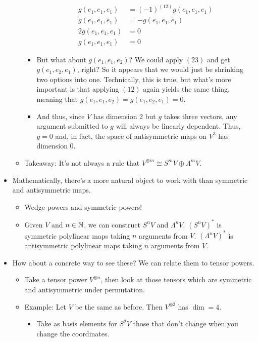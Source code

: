 \documentclass[../notes.tex]{subfiles}
\begin{document}
\begin{itemize}
\begin{itemize}
\begin{itemize}
            \begin{align*}
                g(e_1,e_1,e_1) &= (-1)^{(12)}g(e_1,e_1,e_1)\\
                g(e_1,e_1,e_1) &= -g(e_1,e_1,e_1)\\
                2g(e_1,e_1,e_1) &= 0\\
                g(e_1,e_1,e_1) &= 0
            \end{align*}
            \item But what about $g(e_1,e_1,e_2)$? We could apply $(23)$ and get $g(e_1,e_2,e_1)$, right? So it appears that we would just be shrinking two options into one. Technically, this is true, but what's more important is that applying $(12)$ again yields the same thing, meaning that $g(e_1,e_1,e_2)=g(e_1,e_2,e_1)=0$.
            \item And thus, since $V$ has dimension 2 but $g$ takes three vectors, any argument submitted to $g$ will always be linearly dependent. Thus, $g=0$ and, in fact, the space of antisymmetric maps on $V^3$ has dimension 0.
        \end{itemize}
        \item Takeaway: It's not always a rule that $V^{\otimes m}\cong S^mV\oplus\Lambda^mV$.
    \end{itemize}
    \item Mathematically, there's a more natural object to work with than symmetric and antisymmetric maps.
    \begin{itemize}
        \item Wedge powers and symmetric powers!
        \item Given $V$ and $n\in\mathbb{N}$, we can construct $S^nV$ and $\Lambda^nV$. $(S^nV)^*$ is symmetric polylinear maps taking $n$ arguments from $V$. $(\Lambda^nV)^*$ is antisymmetric polylinear maps taking $n$ arguments from $V$.
    \end{itemize}
    \item How about a concrete way to see these? We can relate them to tensor powers.
    \begin{itemize}
        \item Take a tensor power $V^{\otimes n}$, then look at those tensors which are symmetric and antisymmetric under permutation.
        \item Example: Let $V$ be the same as before. Then $V^{\otimes 2}$ has $\dim=4$.
        \begin{itemize}
            \item Take as basis elements for $S^2V$ those that don't change when you change the coordinates.

\end{itemize}
\end{itemize}
\end{itemize}
\end{document}
